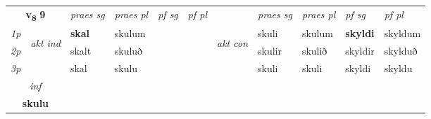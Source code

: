 \noindent
\begin{tabular}{lllllllllll} \toprule
\multicolumn{2}{c}{\textbf{v{\textsubscript{8}}} \Large{\textbf{9}}}  &  \textit{praes sg}  & \textit{praes pl}  &\textit{ pf sg} & \textit{pf pl} &  &  \textit{praes sg}  & \textit{praes pl}  & \textit{pf sg} & \textit{pf pl } \\*
	\cmidrule{3-6} \cmidrule{8-11}
 {\textit{1p}} & \multirow{3}{*}{\begin{turn}{90}\textit{akt ind}\end{turn}} & \textbf{skal} & skulum & \textbf{} & \textbf{} & \multirow{3}{*}{\begin{turn}{90}\textit{akt con}\end{turn}} &skuli & skulum & \textbf{skyldi} & skyldum\\*
 {\textit{2p}} &  &  skalt  & skuluð &  &  & & skulir & skulið & skyldir & skylduð \\*
{\textit{3p}} &  & skal & skulu &  &  & & skuli & skuli& skyldi & skyldu \\*
\cmidrule{3-6} \cmidrule{8-11}
\multicolumn{2}{c}{ \textit{inf}} \\ \multicolumn{2}{c}{ \textbf{skulu}} \\*
\end{tabular}

\noindent
